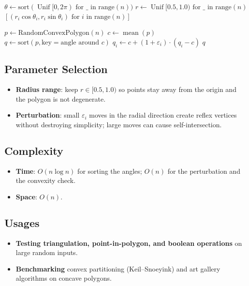 \begin{algorithm}
\caption{Random Polygon Generation}\label{alg:random_polygons}
\begin{algorithmic}
    \State $\theta \gets \text{sort}(\operatorname{Unif}[0, 2\pi) \text{ for } \_ \text{ in range}(n))$
    \State $r \gets \operatorname{Unif}[0.5, 1.0) \text{ for } \_ \text{ in range}(n)$
    \State \Return $[(r_i \cos \theta_i, r_i \sin \theta_i) \text{ for } i \text{ in range}(n)]$
\EndFunction

\Statex

    \State $p \gets \text{RandomConvexPolygon}(n)$
    \State $c \gets \operatorname{mean}(p)$
    \State $q \gets \text{sort}(p, \text{key} = \text{angle around } c)$
         
            \State $q_i \gets c + (1 + \varepsilon_i) \cdot (q_i - c)$
        \EndIf
    \EndFor
    \State \Return $q$
\EndFunction
\end{algorithmic}
\end{algorithm}

\subsection{Parameter Selection}
\begin{itemize}
    \item \textbf{Radius range}: keep $r \in [0.5, 1.0)$ so points stay away
      from the origin and the polygon is not degenerate.
    \item \textbf{Perturbation}: small $\varepsilon_i$ moves in the radial
      direction create reflex vertices without destroying simplicity; large
      moves can cause self-intersection.
\end{itemize}

\subsection{Complexity}
\begin{itemize}
    \item \textbf{Time}: $O(n \log n)$ for sorting the angles; $O(n)$ for the
      perturbation and the convexity check.
    \item \textbf{Space}: $O(n)$.
\end{itemize}

\subsection{Usages}
\begin{itemize}
    \item \textbf{Testing triangulation, point-in-polygon, and boolean
      operations} on large random inputs.
    \item \textbf{Benchmarking} convex partitioning (Keil--Snoeyink) and art
      gallery algorithms on concave polygons.
\end{itemize}

